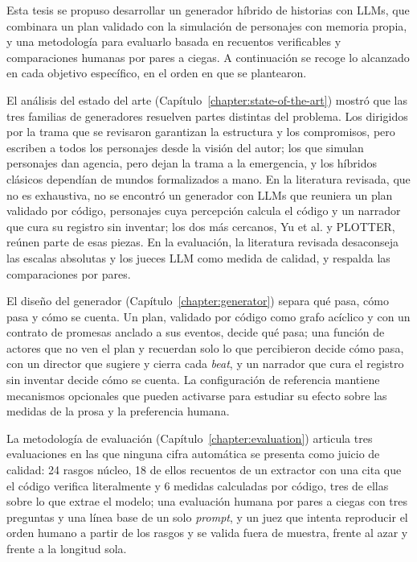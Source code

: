 \begin{conclusions}

Esta tesis se propuso desarrollar un generador híbrido de historias con LLMs, que combinara un plan
validado con la simulación de personajes con memoria propia, y una metodología para evaluarlo basada
en recuentos verificables y comparaciones humanas por pares a ciegas. A continuación se recoge lo
alcanzado en cada objetivo específico, en el orden en que se plantearon.

El análisis del estado del arte (Capítulo~\ref{chapter:state-of-the-art}) mostró que las tres
familias de generadores resuelven partes distintas del problema. Los dirigidos por la trama que se
revisaron garantizan la estructura y los compromisos, pero escriben a todos los personajes desde la
visión del autor; los que simulan personajes dan agencia, pero dejan la trama a la emergencia, y los
híbridos clásicos dependían de mundos formalizados a mano. En la literatura revisada, que no es
exhaustiva, no se encontró un generador con LLMs que reuniera un plan validado por código,
personajes cuya percepción calcula el código y un narrador que cura su registro sin inventar; los dos
más cercanos, Yu et al. y PLOTTER, reúnen parte de esas piezas. En la evaluación, la literatura revisada desaconseja las escalas
absolutas y los jueces LLM como medida de calidad, y respalda las comparaciones por pares.

El diseño del generador (Capítulo~\ref{chapter:generator}) separa qué pasa, cómo pasa y cómo se
cuenta. Un plan, validado por código como grafo acíclico y con un contrato de promesas anclado a sus
eventos, decide qué pasa; una función de actores que no ven el plan y recuerdan solo lo que
percibieron decide cómo pasa, con un director que sugiere y cierra cada \textit{beat}, y un narrador
que cura el registro sin inventar decide cómo se cuenta. La configuración de referencia mantiene
mecanismos opcionales que pueden activarse para estudiar su efecto sobre las medidas de la prosa y
la preferencia humana.

La metodología de evaluación (Capítulo~\ref{chapter:evaluation}) articula tres evaluaciones en las
que ninguna cifra automática se presenta como juicio de calidad: 24 rasgos núcleo, 18 de ellos
recuentos de un extractor con una cita que el código verifica literalmente y 6 medidas calculadas por
código, tres de ellas sobre lo que extrae el modelo; una evaluación humana por pares a ciegas con
tres preguntas y una línea base de un solo \textit{prompt}, y un juez que intenta reproducir el orden
humano a partir de los rasgos y se valida fuera de muestra, frente al azar y frente a la longitud
sola.


\end{conclusions}
